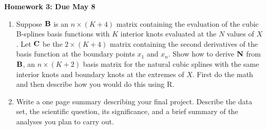 \documentclass[12pt]{article}
\begin{document}
\begin{center}
{\bf Homework 3: Due May 8}
\end{center}

\begin{enumerate}

\item Suppose ${\mathbf B}$ is an $n \times (K+4)$ matrix containing the
  evaluation of the cubic B-splines basis functions with $K$ interior
  knots evaluated at the $N$ values of $X$. Let ${\mathbf C}$ be the $2 \times
  (K+4)$ matrix containing the second derivatives of the basis
  function at the boundary points $x_1$ and $x_n$. Show how to derive
  ${\mathbf N}$ from ${\mathbf B}$, an $n \times (K+2)$ basis matrix for the natural
  cubic splines with the same interior knots and boundary knots at
  the extremes of $X$. First do the math and then describe how you
  would do this using R. 

\item Write a one page summary describing your final project. Describe
  the data set, the scientific question, its significance, and a brief
  summary of the analyses you plan to carry out. 

\end{enumerate}
\end{document}
